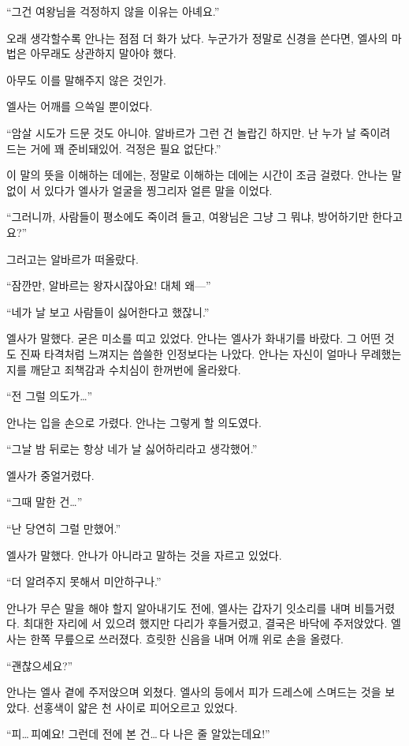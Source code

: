 ``그건 여왕님을 걱정하지 않을 이유는 아녜요.''

오래 생각할수록 안나는 점점 더 화가 났다. 누군가가 정말로 신경을 쓴다면, 엘사의 마법은 아무래도 상관하지 말아야 했다.

아무도 이를 말해주지 않은 것인가.

엘사는 어깨를 으쓱일 뿐이었다.

``암살 시도가 드문 것도 아니야. 알바르가 그런 건 놀랍긴 하지만. 난 누가 날 죽이려 드는 거에 꽤 준비돼있어. 걱정은 필요 없단다.''

이 말의 뜻을 이해하는 데에는, 정말로 이해하는 데에는 시간이 조금 걸렸다. 안나는 말없이 서 있다가 엘사가 얼굴을 찡그리자 얼른 말을 이었다.

``그러니까, 사람들이 평소에도 죽이려 들고, 여왕님은 그냥 그 뭐냐, 방어하기만 한다고요?''

그러고는 알바르가 떠올랐다.

``잠깐만, 알바르는 왕자시잖아요! 대체 왜—''

``네가 날 보고 사람들이 싫어한다고 했잖니.''

엘사가 말했다. 굳은 미소를 띠고 있었다. 안나는 엘사가 화내기를 바랐다. 그 어떤 것도 진짜 타격처럼 느껴지는 씁쓸한 인정보다는 나았다. 안나는 자신이 얼마나 무례했는지를 깨닫고 죄책감과 수치심이 한꺼번에 올라왔다.

``전 그럴 의도가\ldots''

안나는 입을 손으로 가렸다. 안나는 그렇게 할 의도였다.

``그날 밤 뒤로는 항상 네가 날 싫어하리라고 생각했어.''

엘사가 중얼거렸다.

``그때 말한 건\ldots''

``난 당연히 그럴 만했어.''

엘사가 말했다. 안나가 아니라고 말하는 것을 자르고 있었다.

``더 알려주지 못해서 미안하구나.''

안나가 무슨 말을 해야 할지 알아내기도 전에, 엘사는 갑자기 잇소리를 내며 비틀거렸다. 최대한 자리에 서 있으려 했지만 다리가 후들거렸고, 결국은 바닥에 주저앉았다. 엘사는 한쪽 무릎으로 쓰러졌다. 흐릿한 신음을 내며 어깨 위로 손을 올렸다.

``괜찮으세요?''

안나는 엘사 곁에 주저앉으며 외쳤다. 엘사의 등에서 피가 드레스에 스며드는 것을 보았다. 선홍색이 얇은 천 사이로 피어오르고 있었다.

``피\ldots\,피예요! 그런데 전에 본 건\ldots\,다 나은 줄 알았는데요!''

